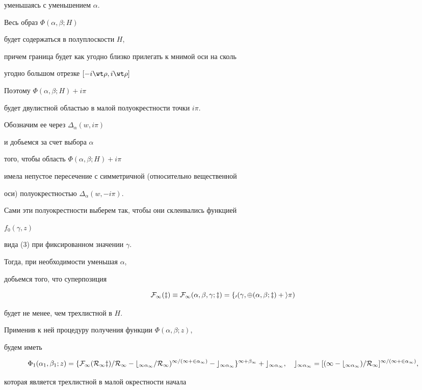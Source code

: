 \begin{pf}
уменьшаясь с уменьшением $\alpha$. 


Весь образ $\Phi(\alpha,\beta;H)$ 


будет содержаться в полуплоскости $H$, 


причем граница будет как угодно близко прилегать к мнимой оси на сколь  


угодно большом отрезке $[-i\wt\rho,i\wt\rho]$ 


Поэтому $\Phi(\alpha,\beta;H)+i\pi$ 


будет двулистной областью в малой полуокрестности точки $i\pi$. 


Обозначим ее через $\Delta_\alpha(w,i\pi)$ 


и добьемся за счет выбора $\alpha$ 


того, чтобы область $\Phi(\alpha,\beta;H)+i\pi$ 


имела непустое пересечение с симметричной (относительно вещественной 


оси) полуокрестностью $\Delta_\alpha(w,-i\pi)$.


Сами эти полуокрестности выберем так, чтобы они склеивались функцией 


$f_0(\gamma,z)$ 


вида (3) при фиксированном значении $\gamma$. 


Тогда, при необходимости уменьшая $\alpha$, 


добьемся того, что суперпозиция 


$$ 


\cal F_1(z)\equiv\cal F_1(\alpha,\beta,\gamma;z)= 


f_0(\gamma,\Phi(\alpha,\beta;z)+i\pi) 


$$ 


будет не менее, чем трехлистной в $H$. 


 


Применив к ней процедуру получения функции $\Phi(\alpha,\beta;z)$, 


будем иметь 


$$ 


\Phi_1(\alpha_1,\beta_1;z)=\{\cal F_1(R_1z)/R_1- 


b_{1\alpha_1}/R_1)^{1/(1+2\alpha_1)}-c_{1\alpha_1} 


\}^{1+\beta_1}+c_{1\alpha_1},\quad 


c_{1\alpha_1}=[(1-b_{1\alpha_1})/R_1]^{1/(1+2\alpha_1)}, 


$$ 


которая является трехлистной в малой окрестности начала 



\end{pf}
